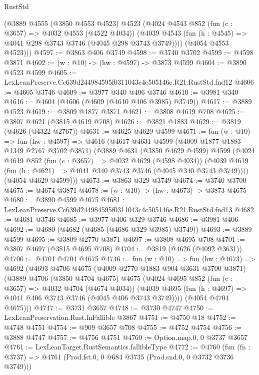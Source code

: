 \begin{lexlean}{RustStd}
\begin{coremodule}
      (@3889
        @4555
        (@3850 @4553 @4523)
        @4523
        (@4024
          @4543
          @852
          (fun (c : @3657) => @4032 @4553 (@4522 @4034))
          (@4039 @4543 (fun (h : @4545) => @4041 @298 @3743 @3746 (@4045 @298 @3743 @3749))))
        (@4054 @4553 @4523)))
@4597 := @3863 @406 @3749
@4598 := @3740 @3702
@4599 := @4598 @3871
@4602 := (w : @10) -> (hw : @4597) -> @3873 @4599
@4604 := @3890 @4523 @4599
@4605 := LexLeanPreserve.Cc639d244984595f0311043c4c505146e.R21.RustStd.fnd12
@4606 := @4605 @3746
@4609 := @3977 @340 @406 @3746
@4610 := @3981 @340
@4616 := @4604 (@4606 (@4609 (@4610 @406 @3985) @3749))
@4617 := @3889 @4523
@4619 := @3809 @1877 @3871
@4621 := @3808 @4619 @708
@4625 := @3807 @4621 (@3815 @4619 @708)
@4626 := @3821 @1883
@4629 := @3819 (@4626 (@4322 @2767))
@4631 := @4625 @4629 @4599
@4671 := fun (w : @10) =>
  fun (hw : @4597) =>
  @4616
    (@4617
      @4631
      @4599
      (@4009 @1877 @1883 @1349 @2767 @3702 @3871)
      (@3889
        @4631
        (@3850 @4629 @4599)
        @4599
        (@4024
          @4619
          @852
          (fun (c : @3657) => @4032 @4629 (@4598 @4034))
          (@4039 @4619 (fun (h : @4621) => @4041 @340 @3743 @3746 (@4045 @340 @3743 @3749))))
        (@4054 @4629 @4599)))
@4673 := @3863 @329 @3749
@4674 := @3740 @3700
@4675 := @4674 @3871
@4678 := (w : @10) -> (hw : @4673) -> @3873 @4675
@4680 := @3890 @4599 @4675
@4681 := LexLeanPreserve.Cc639d244984595f0311043c4c505146e.R21.RustStd.fnd13
@4682 := @4681 @3746
@4685 := @3977 @406 @329 @3746
@4686 := @3981 @406
@4692 := @4680 (@4682 (@4685 (@4686 @329 @3985) @3749))
@4693 := @3889 @4599
@4695 := @3809 @2770 @3871
@4697 := @3808 @4695 @708
@4701 := @3807 @4697 (@3815 @4695 @708)
@4704 := @3819 (@4626 (@4092 @3631))
@4706 := @4701 @4704 @4675
@4746 := fun (w : @10) =>
  fun (hw : @4673) =>
  @4692
    (@4693
      @4706
      @4675
      (@4009 @2770 @1883 @904 @3631 @3700 @3871)
      (@3889
        @4706
        (@3850 @4704 @4675)
        @4675
        (@4024
          @4695
          @852
          (fun (c : @3657) => @4032 @4704 (@4674 @4034))
          (@4039 @4695 (fun (h : @4697) => @4041 @406 @3743 @3746 (@4045 @406 @3743 @3749))))
        (@4054 @4704 @4675)))
@4747 := @3731 @3657
@4748 := @3730 @4747
@4750 := LexLeanPreservation.Rust.fnFallible @3867
@4751 := @4750 @18
@4752 := @4748 @4751
@4754 := @909 @3657 @708
@4755 := @4752 @4754
@4756 := @3888 @4747
@4757 := @4756 @4751
@4760 := Option.map.{0, 0} @3737 @3657
@4761 := LexLeanTarget.RustSemantics.fallibleType
@4772 := @4760
    (fun (fn : @3737) => @4761 (Prod.fst.{0, 0} @684 @3735 (Prod.snd.{0, 0} @3732 @3736 @3749)))

\end{coremodule}
\end{lexlean}
